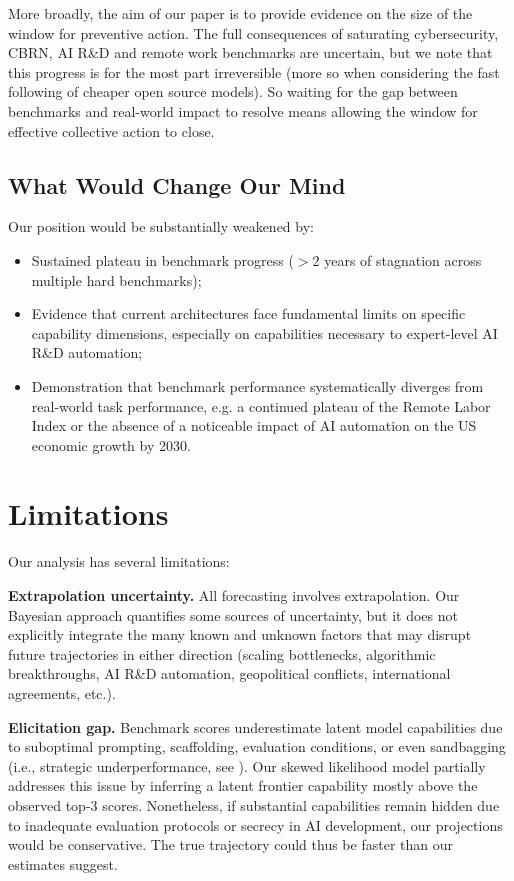 \documentclass[letterpaper,twocolumn]{article}
\newcommand{\revised}[1]{#1}
\begin{document}
{More broadly, the aim of our paper is to provide evidence on the size of the window for preventive action. The full consequences of saturating cybersecurity, CBRN, AI R\&D and remote work benchmarks are uncertain, but we note that this progress is for the most part irreversible (more so when considering the fast following of cheaper open source models). So waiting for the gap between benchmarks and real-world impact to resolve means allowing the window for effective collective action to close.}

\subsection{What Would Change Our Mind}
\label{subsec:change_mind}

Our position would be substantially weakened by:
\begin{itemize}
    \item Sustained plateau in benchmark progress ($>2$ years of stagnation across multiple hard benchmarks);
    \item Evidence that current architectures face fundamental limits on specific capability dimensions\revised{, especially on capabilities necessary to expert-level AI R\&D automation};
    \item Demonstration that benchmark performance systematically diverges from real-world task performance, e.g. a continued plateau of the Remote Labor Index \citep{mazeika_remote_2025} or the absence of a noticeable impact of AI automation on the US economic growth by 2030.
\end{itemize}

\section{Limitations}
\label{sec:limitations}

Our analysis has several limitations:

\textbf{Extrapolation uncertainty.} All forecasting involves extrapolation.
Our Bayesian approach quantifies some sources of uncertainty, but it does not explicitly integrate the many known and unknown factors that may disrupt future trajectories in either direction (scaling bottlenecks, algorithmic breakthroughs, AI R\&D automation, geopolitical conflicts, international agreements, etc.).

\textbf{Elicitation gap.} Benchmark scores underestimate latent model capabilities due to suboptimal prompting, scaffolding, evaluation conditions, or even sandbagging (i.e., strategic underperformance, see \citet{weij_ai_2025}). Our skewed likelihood model partially addresses this issue by inferring a latent frontier capability mostly above the observed top-3 scores. Nonetheless, if substantial capabilities remain hidden due to inadequate evaluation protocols or secrecy in AI development, our projections would be conservative. The true trajectory could thus be faster than our estimates suggest.
\end{document}
